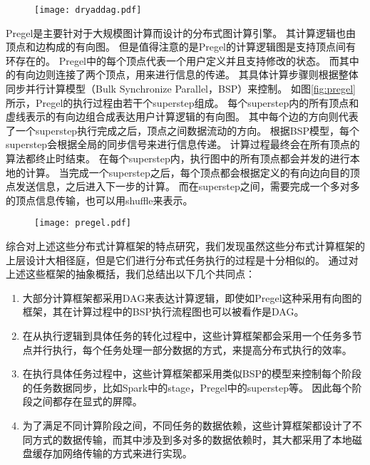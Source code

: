 \begin{figure}[!htp]
    \centering
    \texttt{[image: dryaddag.pdf]}
\end{figure}

Pregel\cite{pregel}是主要针对于大规模图计算而设计的分布式图计算引擎。
其计算逻辑也由顶点和边构成的有向图。
但是值得注意的是Pregel的计算逻辑图是支持顶点间有环存在的。
Pregel中的每个顶点代表一个用户定义并且支持修改的状态。
而其中的有向边则连接了两个顶点，用来进行信息的传递。
其具体计算步骤则根据整体同步并行计算模型（Bulk Synchronize Parallel，BSP）来控制。
如图\ref{fig:pregel}所示，Pregel的执行过程由若干个superstep组成。
每个superstep内的所有顶点和虚线表示的有向边组合成表达用户计算逻辑的有向图。
其中每个边的方向则代表了一个superstep执行完成之后，顶点之间数据流动的方向。
根据BSP模型，每个superstep会根据全局的同步信号来进行信息传递。
计算过程最终会在所有顶点的算法都终止时结束。
在每个superstep内，执行图中的所有顶点都会并发的进行本地的计算。
当完成一个superstep之后，每个顶点都会根据定义的有向边向目的顶点发送信息，之后进入下一步的计算。
而在superstep之间，需要完成一个多对多的顶点信息传输，也可以用shuffle来表示。

\begin{figure}[!htp]
    \centering
    \texttt{[image: pregel.pdf]}
\end{figure}

综合对上述这些分布式计算框架的特点研究，我们发现虽然这些分布式计算框架的上层设计大相径庭，但是它们进行分布式任务执行的过程是十分相似的。
通过对上述这些框架的抽象概括，我们总结出以下几个共同点：

\begin{enumerate}
	\item 大部分计算框架都采用DAG来表达计算逻辑，即使如Pregel这种采用有向图的框架，其在计算过程中的BSP执行流程图也可以被看作是DAG。
	\item 在从执行逻辑到具体任务的转化过程中，这些计算框架都会采用一个任务多节点并行执行，每个任务处理一部分数据的方式，来提高分布式执行的效率。
	\item 在执行具体任务过程中，这些计算框架都采用类似BSP的模型来控制每个阶段的任务数据同步，比如Spark中的stage，Pregel中的superstep等。
	因此每个阶段之间都存在显式的屏障。
	\item 为了满足不同计算阶段之间，不同任务的数据依赖，这些计算框架都设计了不同方式的数据传输，而其中涉及到多对多的数据依赖时，其大都采用了本地磁盘缓存加网络传输的方式来进行实现。 
\end{enumerate}

